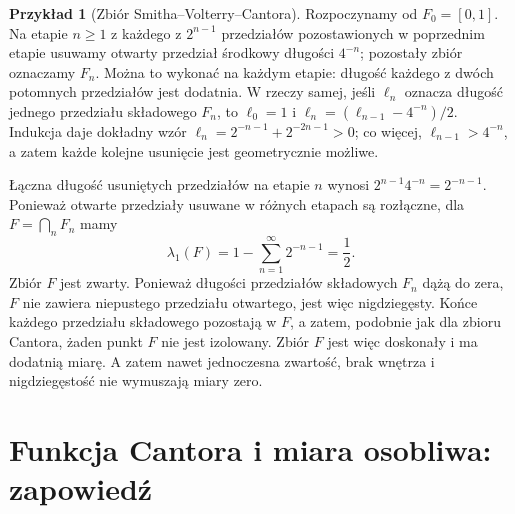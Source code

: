 \documentclass[11pt,a4paper,oneside]{book}
\numberwithin{equation}{chapter}
\theoremstyle{plain}
\theoremstyle{definition}
\newtheorem{przyklad}[twierdzenie]{Przykład}
\theoremstyle{remark}
\begin{document}
\begin{przyklad}[Zbiór Smitha--Volterry--Cantora]
\label{ex:fat-cantor}
Rozpoczynamy od $F_0=[0,1]$. Na etapie $n\ge1$
z każdego z $2^{n-1}$ przedziałów pozostawionych
w poprzednim etapie usuwamy otwarty przedział środkowy
długości $4^{-n}$; pozostały zbiór oznaczamy $F_n$.
Można to wykonać na każdym etapie: długość każdego
z dwóch potomnych przedziałów jest dodatnia.
W rzeczy samej, jeśli $\ell_n$ oznacza długość jednego
przedziału składowego $F_n$, to
$\ell_0=1$ i $\ell_n=(\ell_{n-1}-4^{-n})/2$.
Indukcja daje dokładny wzór
$\ell_n=2^{-n-1}+2^{-2n-1}>0$; co więcej,
$\ell_{n-1}>4^{-n}$, a zatem każde kolejne
usunięcie jest geometrycznie możliwe.

Łączna długość usuniętych przedziałów na etapie $n$
wynosi $2^{n-1}4^{-n}=2^{-n-1}$. Ponieważ otwarte
przedziały usuwane w różnych etapach są rozłączne,
dla $F=\bigcap_nF_n$ mamy
\[
\lambda_1(F)=1-\sum_{n=1}^\infty2^{-n-1}=\frac12.
\]
Zbiór $F$ jest zwarty. Ponieważ długości przedziałów
składowych $F_n$ dążą do zera, $F$ nie zawiera
niepustego przedziału otwartego, jest więc nigdziegęsty.
Końce każdego przedziału składowego pozostają w $F$,
a zatem, podobnie jak dla zbioru Cantora, żaden punkt
$F$ nie jest izolowany. Zbiór $F$ jest więc doskonały
i ma dodatnią miarę. A zatem nawet jednoczesna
zwartość, brak wnętrza i nigdziegęstość nie
wymuszają miary zero.
\end{przyklad}

\section{Funkcja Cantora i miara osobliwa: zapowiedź}
\end{document}
